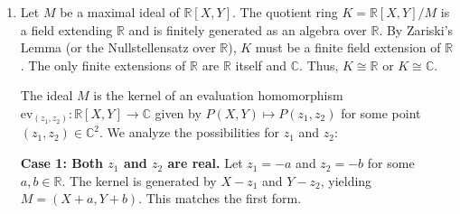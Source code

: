 \documentclass{article}
\begin{document}
\begin{enumerate}[label=\fbox{\arabic*}]
\begin{itemize}
          \item Order 1: $\langle I \rangle$
          \item Order 2: $\langle -I \rangle$
          \item Order 3: $\langle \begin{pmatrix} 0 & -1 \\ 1 & -1 \end{pmatrix} \rangle$
          \item Order 4: $\langle \begin{pmatrix} 0 & -1 \\ 1 & 0 \end{pmatrix} \rangle$
          \item Order 6: $\langle \begin{pmatrix} 0 & -1 \\ 1 & 1 \end{pmatrix} \rangle$
        \end{itemize}
        Therefore, the possible groups are the cyclic groups $G \cong \mathbb{Z}/n\mathbb{Z}$ for $n \in \{1, 2, 3, 4, 6\}$.

  \item %
        Let $M$ be a maximal ideal of $\mathbb{R}[X, Y]$. The quotient ring $K = \mathbb{R}[X, Y]/M$ is a field extending $\mathbb{R}$ and is finitely generated as an algebra over $\mathbb{R}$. By Zariski's Lemma (or the Nullstellensatz over $\mathbb{R}$), $K$ must be a finite field extension of $\mathbb{R}$. The only finite extensions of $\mathbb{R}$ are $\mathbb{R}$ itself and $\mathbb{C}$. Thus, $K \cong \mathbb{R}$ or $K \cong \mathbb{C}$.
        
        The ideal $M$ is the kernel of an evaluation homomorphism $\mathrm{ev}_{(z_1, z_2)}: \mathbb{R}[X, Y] \to \mathbb{C}$ given by $P(X, Y) \mapsto P(z_1, z_2)$ for some point $(z_1, z_2) \in \mathbb{C}^2$. We analyze the possibilities for $z_1$ and $z_2$:
        
        \textbf{Case 1: Both $z_1$ and $z_2$ are real.}
        Let $z_1 = -a$ and $z_2 = -b$ for some $a, b \in \mathbb{R}$. The kernel is generated by $X - z_1$ and $Y - z_2$, yielding $M = (X + a, Y + b)$. This matches the first form.
        

\end{enumerate}
\end{document}
